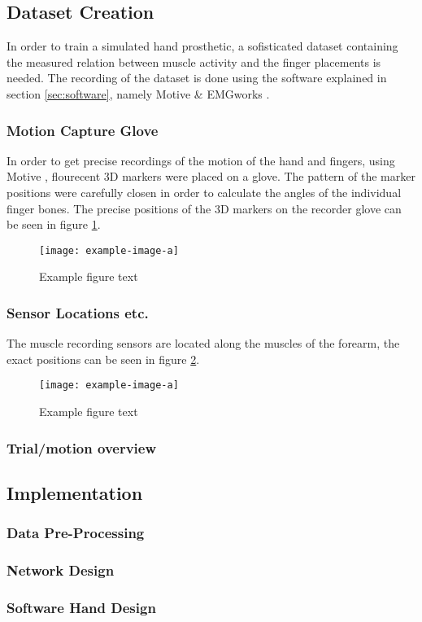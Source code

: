 \documentclass[../main.tex]{subfiles}
\begin{document}
\subsection{Dataset Creation}

In order to train a simulated hand prosthetic, a sofisticated dataset containing the measured relation between muscle activity and the finger placements is needed.
The recording of the dataset is done using the software explained in section \ref{sec:software}, namely Motive \cite{motive} \& EMGworks \cite{emgworks}.

\subsubsection{Motion Capture Glove}

In order to get precise recordings of the motion of the hand and fingers, using Motive \cite{motive}, flourecent 3D markers were placed on a glove.
The pattern of the marker positions were carefully closen in order to calculate the angles of the individual finger bones.
The precise positions of the 3D markers on the recorder glove can be seen in figure \ref{fig:glove}.

\begin{figure}[h]
\begin{center}
\texttt{[image: example-image-a]}
\caption{Example figure text}
\label{fig:glove}
\end{center}
\end{figure}

\subsubsection{Sensor Locations etc.}

The muscle recording sensors are located along the muscles of the forearm, the exact positions can be seen in figure \ref{fig:musclesensors}.

\begin{figure}[h]
\begin{center}
\texttt{[image: example-image-a]}
\caption{Example figure text}
\label{fig:musclesensors}
\end{center}
\end{figure}

\subsubsection{Trial/motion overview}

\subsection{Implementation}
\subsubsection{Data Pre-Processing}
\subsubsection{Network Design}
\subsubsection{Software Hand Design}
\end{document}
